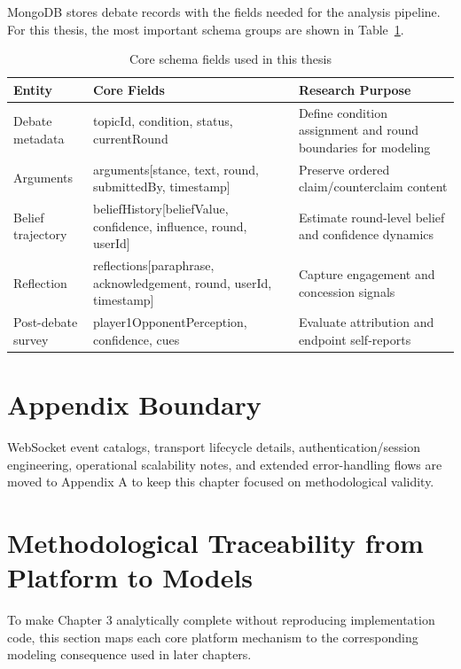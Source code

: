 MongoDB stores debate records with the fields needed for the analysis pipeline.
For this thesis, the most important schema groups are shown in
Table~\ref{tab:research_schema_core}.

\begin{table}[htbp]
\centering
\small
\setlength{\tabcolsep}{4pt}
\begin{tabular}{p{3.0cm}p{5.3cm}p{6.1cm}}
\toprule
\textbf{Entity} & \textbf{Core Fields} & \textbf{Research Purpose} \\
\midrule
Debate metadata & {\ttfamily topicId, condition, status, currentRound} & Define condition assignment and round boundaries for modeling \\
Arguments & {\ttfamily arguments[stance, text, round, submittedBy, timestamp]} & Preserve ordered claim/counterclaim content \\
Belief trajectory & {\ttfamily beliefHistory[belief\allowbreak Value, confidence, influence, round, userId]} & Estimate round-level belief and confidence dynamics \\
Reflection & {\ttfamily reflections[paraphrase, acknowledgement, round, userId, timestamp]} & Capture engagement and concession signals \\
Post-debate survey & {\ttfamily player1Opponent\allowbreak Perception, confidence, cues} & Evaluate attribution and endpoint self-reports \\
\bottomrule
\end{tabular}
\caption{Core schema fields used in this thesis}
\label{tab:research_schema_core}
\end{table}

\section{Appendix Boundary}

WebSocket event catalogs, transport lifecycle details, authentication/session
engineering, operational scalability notes, and extended error-handling flows are
moved to Appendix A to keep this chapter focused on methodological validity.

\section{Methodological Traceability from Platform to Models}

To make Chapter 3 analytically complete without reproducing implementation code,
this section maps each core platform mechanism to the corresponding modeling
consequence used in later chapters.

